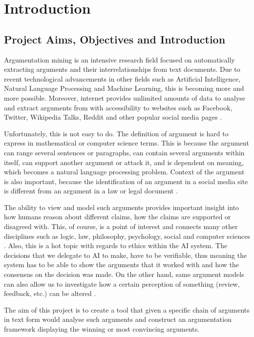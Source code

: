 \section{Introduction}
\subsection{Project Aims, Objectives and Introduction} 
 Argumentation mining is an intensive research field focused on automatically extracting arguments and their interrelationships from text documents. Due to recent technological advancements in other fields such as Artificial Intelligence, Natural Language Processing and Machine Learning, this is becoming more and more possible. Moreover, internet provides unlimited amounts of data to analyse and extract arguments from with accessibility to websites such as Facebook, Twitter, Wikipedia Talks, Reddit and other popular social media pages \citep{ArgMiningStateOfTheArt}. 
 
 Unfortunately, this is not easy to do. The definition of argument is hard to express in mathematical or computer science terms. This is because the argument can range several sentences or paragraphs, can contain several arguments within itself, can support another argument or attack it, and is dependent on meaning, which becomes a natural language processing problem. Context of the argument is also important, because the identification of an argument in a social media site is different from an argument in a law or legal document \citep{MiningBAFfromNatLang}.

 The ability to view and model such arguments provides important insight into how humans reason about different claims, how the claims are supported or disagreed with. This, of course, is a point of interest and connects many other disciplines such as logic, law, philosophy, psychology, social and computer sciences \citep{ArgMiningStateOfTheArt}. Also, this is a hot topic with regards to ethics within the AI system. The decisions that we delegate to AI to make, have to be verifiable, thus meaning the system has to be able to show the arguments that it worked with and how the consensus on the decision was made. On the other hand, same argument models can also allow us to investigate how a certain perception of something (review, feedback, etc.) can be altered \citep{ApproxToTruth}.
 
 The aim of this project is to create a tool that given a specific chain of arguments in text form would analyse such arguments and construct an argumentation framework displaying the winning or most convincing arguments. 
 

